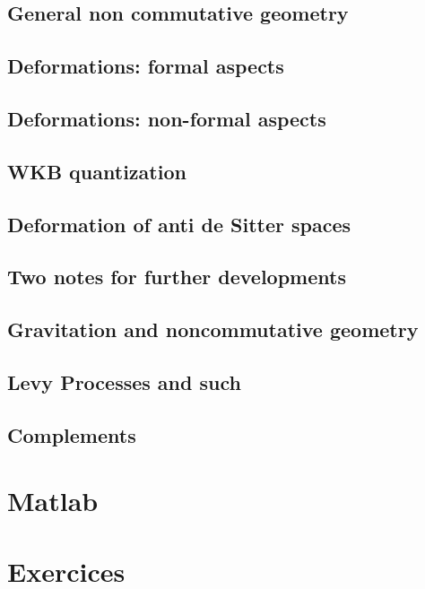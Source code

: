 \chapter{General non commutative geometry}




\chapter{Deformations: formal aspects}          \label{ChapDefo}


\chapter{Deformations: non-formal aspects}


      

\chapter{WKB quantization}


\chapter{Deformation of anti de Sitter spaces}   \label{ChDefoBH}


\chapter{Two notes for further developments}        \label{ChapNoteDev}



\chapter{Gravitation and noncommutative geometry}


\chapter{Levy Processes and such}


\chapter{Complements}








%

\part{Matlab}



%

\part{Exercices} 







%

 
